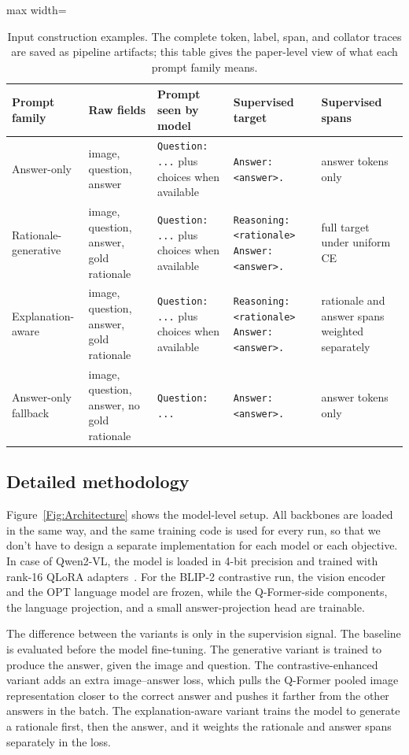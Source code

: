 \documentclass[preprint,12pt]{elsarticle}
\begin{document}
\begin{table}[!ht]
\centering
\caption{Input construction examples. The complete token, label, span, and collator traces are saved as pipeline artifacts; this table gives the paper-level view of what each prompt family means.}
\label{tab:InputConstruction}
\scriptsize
\begin{adjustbox}{max width=\textwidth}
\begin{tabular}{|p{2.5cm}|p{3.6cm}|p{4.5cm}|p{4.5cm}|p{2.8cm}|}
\hline
\textbf{Prompt family} & \textbf{Raw fields} & \textbf{Prompt seen by model} & \textbf{Supervised target} & \textbf{Supervised spans} \\ \hline
Answer-only & image, question, answer & \texttt{Question: ...} plus choices when available & \texttt{Answer: <answer>.} & answer tokens only \\
Rationale-generative & image, question, answer, gold rationale & \texttt{Question: ...} plus choices when available & \texttt{Reasoning: <rationale> Answer: <answer>.} & full target under uniform CE \\
Explanation-aware & image, question, answer, gold rationale & \texttt{Question: ...} plus choices when available & \texttt{Reasoning: <rationale> Answer: <answer>.} & rationale and answer spans weighted separately \\
Answer-only fallback & image, question, answer, no gold rationale & \texttt{Question: ...} & \texttt{Answer: <answer>.} & answer tokens only \\ \hline
\end{tabular}
\end{adjustbox}
\end{table}

\subsection{Detailed methodology}
Figure~\ref{Fig:Architecture} shows the model-level setup.
All backbones are loaded in the same way, and the same training code is used for every run,
so that we don't have to design a separate implementation for each model or each objective.
In case of Qwen2-VL, the model is loaded in 4-bit precision and trained with rank-16 QLoRA adapters~\cite{hu2022lora,dettmers2023qlora}.
For the BLIP-2 contrastive run, the vision encoder and the OPT language model are frozen,
while the Q-Former-side components, the language projection, and a small answer-projection head are trainable.

The difference between the variants is only in the supervision signal.
The baseline is evaluated before the model fine-tuning.
The generative variant is trained to produce the answer, given the image and question.
The contrastive-enhanced variant adds an extra image--answer loss, which pulls the Q-Former pooled image representation
closer to the correct answer and pushes it farther from the other answers in the batch.
The explanation-aware variant trains the model to generate a rationale first, then the answer, and it weights the rationale and answer spans separately in the loss.
\end{document}
